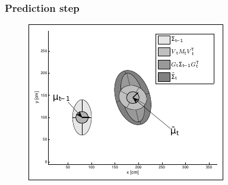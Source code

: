 \begin{frame}
	\frametitle{Prediction step}
	
	\begin{figure}[!h]
		\includegraphics[width=0.5\columnwidth]{./images/prediction_step.pdf}
	\end{figure}
	
\end{frame}

